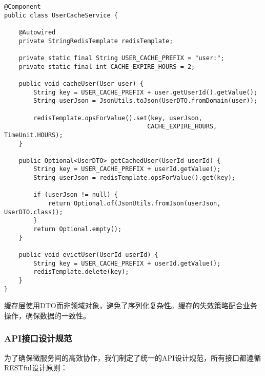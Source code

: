 \documentclass[a4paper,12pt]{article}
\begin{document}
\begin{lstlisting}[caption=Redis缓存实现]
@Component
public class UserCacheService {
    
    @Autowired
    private StringRedisTemplate redisTemplate;
    
    private static final String USER_CACHE_PREFIX = "user:";
    private static final int CACHE_EXPIRE_HOURS = 2;
    
    public void cacheUser(User user) {
        String key = USER_CACHE_PREFIX + user.getUserId().getValue();
        String userJson = JsonUtils.toJson(UserDTO.fromDomain(user));
        
        redisTemplate.opsForValue().set(key, userJson, 
                                       CACHE_EXPIRE_HOURS, TimeUnit.HOURS);
    }
    
    public Optional<UserDTO> getCachedUser(UserId userId) {
        String key = USER_CACHE_PREFIX + userId.getValue();
        String userJson = redisTemplate.opsForValue().get(key);
        
        if (userJson != null) {
            return Optional.of(JsonUtils.fromJson(userJson, UserDTO.class));
        }
        return Optional.empty();
    }
    
    public void evictUser(UserId userId) {
        String key = USER_CACHE_PREFIX + userId.getValue();
        redisTemplate.delete(key);
    }
}
\end{lstlisting}

缓存层使用DTO而非领域对象，避免了序列化复杂性。缓存的失效策略配合业务操作，确保数据的一致性。

\subsubsection{API接口设计规范}

为了确保微服务间的高效协作，我们制定了统一的API设计规范，所有接口都遵循RESTful设计原则：
\end{document}
